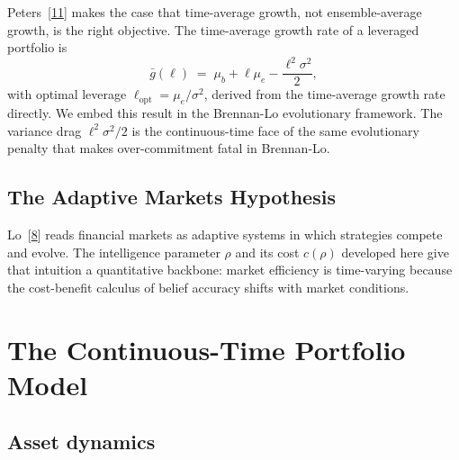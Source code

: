 \documentclass[11pt]{article}
\newcommand{\mue}{\mu_{e}}
\newcommand{\mub}{\mu_{b}}
\begin{document}
Peters~[\hyperlink{ref:11}{11}] makes the case that time-average growth, not
ensemble-average growth, is the right objective. The time-average
growth rate of a leveraged portfolio is
\[
  \bar{g}(\ell) \;=\; \mub + \ell\mue - \frac{\ell^{2}\sigma^{2}}{2},
\]
with optimal leverage $\ell_{\mathrm{opt}} = \mue/\sigma^{2}$,
derived from the time-average growth rate directly. We embed this
result in the Brennan-Lo evolutionary
framework. The variance drag $\ell^{2}\sigma^{2}/2$ is the
continuous-time face of the same evolutionary penalty that makes
over-commitment fatal in Brennan-Lo.

\subsection{The Adaptive Markets Hypothesis}

Lo~[\hyperlink{ref:8}{8}] reads financial markets as adaptive systems in which
strategies compete and evolve. The intelligence parameter $\rho$ and
its cost $c(\rho)$ developed here give that intuition a quantitative
backbone: market efficiency is time-varying because the cost-benefit
calculus of belief accuracy shifts with market conditions.

\section{The Continuous-Time Portfolio Model}

\subsection{Asset dynamics}
\end{document}
